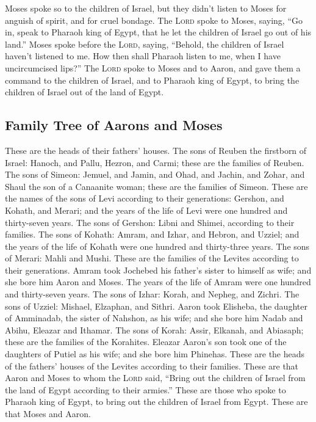  Moses spoke so to the children of Israel, but they didn't
listen to Moses for anguish of spirit, and for cruel bondage.
 The \textsc{Lord} spoke to Moses, saying,
 ``Go in, speak to Pharaoh king of Egypt, that he let the
children of Israel go out of his land.''  Moses spoke
before the \textsc{Lord}, saying, ``Behold, the children of Israel
haven't listened to me. How then shall Pharaoh listen to me, when I have
uncircumcised lips?''  The \textsc{Lord} spoke to Moses
and to Aaron, and gave them a command to the children of Israel, and to
Pharaoh king of Egypt, to bring the children of Israel out of the land
of Egypt.

\hypertarget{family-tree-of-aarons-and-moses}{%
\subsection{Family Tree of Aarons and
Moses}\label{family-tree-of-aarons-and-moses}}

 These are the heads of their fathers' houses. The sons
of Reuben the firstborn of Israel: Hanoch, and Pallu, Hezron, and Carmi;
these are the families of Reuben.  The sons of Simeon:
Jemuel, and Jamin, and Ohad, and Jachin, and Zohar, and Shaul the son of
a Canaanite woman; these are the families of Simeon. 
These are the names of the sons of Levi according to their generations:
Gershon, and Kohath, and Merari; and the years of the life of Levi were
one hundred and thirty-seven years.  The sons of Gershon:
Libni and Shimei, according to their families.  The sons
of Kohath: Amram, and Izhar, and Hebron, and Uzziel; and the years of
the life of Kohath were one hundred and thirty-three years.
 The sons of Merari: Mahli and Mushi. These are the
families of the Levites according to their generations. 
Amram took Jochebed his father's sister to himself as wife; and she bore
him Aaron and Moses. The years of the life of Amram were one hundred and
thirty-seven years.  The sons of Izhar: Korah, and
Nepheg, and Zichri.  The sons of Uzziel: Mishael,
Elzaphan, and Sithri.  Aaron took Elisheba, the daughter
of Amminadab, the sister of Nahshon, as his wife; and she bore him Nadab
and Abihu, Eleazar and Ithamar.  The sons of Korah:
Assir, Elkanah, and Abiasaph; these are the families of the Korahites.
 Eleazar Aaron's son took one of the daughters of Putiel
as his wife; and she bore him Phinehas. These are the heads of the
fathers' houses of the Levites according to their families.
 These are that Aaron and Moses to whom the \textsc{Lord}
said, ``Bring out the children of Israel from the land of Egypt
according to their armies.''  These are those who spoke
to Pharaoh king of Egypt, to bring out the children of Israel from
Egypt. These are that Moses and Aaron.

